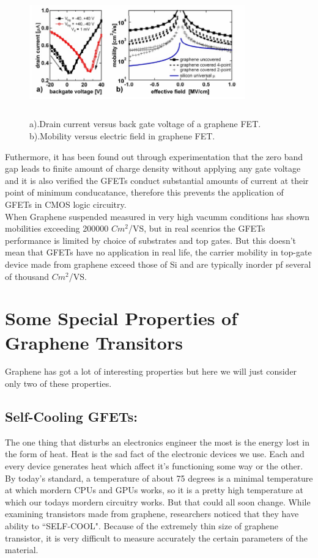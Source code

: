 \documentclass[conference]{IEEEtran}
\begin{document}
\begin{figure}[h]
\centering
\includegraphics[width=9.35cm, height=5.5cm]{5.jpg}
\caption{a).Drain current versus back gate voltage of a graphene FET. b).Mobility versus electric field in graphene FET.}
\end{figure}

Futhermore, it has been found out through experimentation that the zero band gap leads to finite amount of charge density without applying any gate voltage and it is also verified the GFETs conduct substantial amounts of current at their point of minimum conducatance, therefore this prevents the application of GFETs in CMOS logic circuitry.
\\

When Graphene suspended measured in very high vacumm conditions has shown mobilities exceeding 200000 $Cm^2$/VS, but in real scenrios the GFETs performance is limited by choice of substrates and top gates. But this doesn't mean that GFETs have no application in real life, the carrier mobility in top-gate device made from graphene exceed those of Si and are typically inorder pf several of thousand $Cm^2$/VS. 
\\

\section{\textbf{Some Special Properties of Graphene Transitors}}
Graphene has got a lot of interesting properties but here we will just consider only two of these properties.
\\

\subsection{\textbf{Self-Cooling GFETs:}}
The one thing that disturbs an electronics engineer the most is the energy lost in the form of heat. Heat is the sad fact of the electronic devices we use. Each and every device generates heat which affect it's functioning some way or the other. By today's standard, a temperature of about 75 degrees is a minimal temperature at which mordern CPUs and GPUs works, so it is a pretty high temperature at which our todays mordern circuitry works. But that could all soon change. While examining transistors made from graphene, researchers noticed that they have ability to ``SELF-COOL". Because of the extremely thin size of graphene transistor, it is very difficult to measure accurately the certain parameters of the material.
\\
\end{document}
